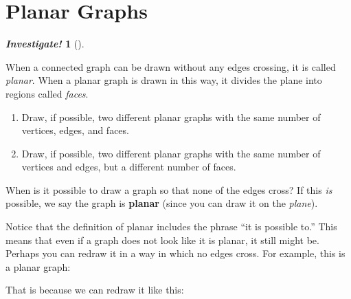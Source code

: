 \documentclass[10pt,]{book}
\newcommand{\terminology}[1]{\textbf{#1}}
\theoremstyle{plain}
\theoremstyle{definition}
\theoremstyle{definition}
\newtheorem{investigation}[project]{\emph{Investigate!}}
\theoremstyle{definition}
\numberwithin{equation}{chapter}
\newcommand{\vtx}[2]{node[fill,circle,inner sep=0pt, minimum size=4pt,label=#1:#2]{}}
\renewcommand{\v}{\vtx{above}{}}
\begin{document}
\section[Planar Graphs]{Planar Graphs}\label{sec_planar}
\typeout{************************************************}
\typeout{************************************************}
\begin{investigation}[]\label{investigation-30}

When a connected graph can be drawn without any edges crossing, it is called \emph{planar}. When a planar graph is drawn in this way, it divides the plane into regions called \emph{faces}.
\leavevmode%
\begin{enumerate}
\item\hypertarget{li-1210}{}
Draw, if possible, two different planar graphs with the same number of vertices, edges, and faces.
%
\item\hypertarget{li-1211}{}
Draw, if possible, two different planar graphs with the same number of vertices and edges, but a different number of faces.
%
\end{enumerate}

%
\end{investigation}

When is it possible to draw a graph so that none of the edges cross? If this \emph{is} possible, we say the graph is \terminology{planar} (since you can draw it on the \emph{plane}).
%
\par

Notice that the definition of planar includes the phrase ``it is possible to.'' This means that even if a graph does not look like it is planar, it still might be. Perhaps you can redraw it in a way in which no edges cross. For example, this is a planar graph:
%
\leavevmode%
\begin{figure}
\centering
{
}
\end{figure}
\par

That is because we can redraw it like this:
%
\leavevmode%
\begin{figure}
\centering
{
}
\end{figure}
\par
\end{document}

